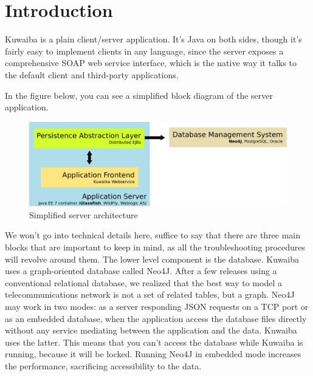 \documentclass[a4paper]{article}
\begin{document}
	\newpage
	\section{Introduction}
		Kuwaiba is a plain client/server application. It's Java on both sides, though it's fairly easy to implement clients in any language, since the server exposes a comprehensive SOAP web service interface, which is the native way it talks to the default client and third-party applications. 
		
		In the figure below, you can see a simplified block diagram of the server application.
		\begin{figure}[h!] %
			\includegraphics[width=\linewidth]{img/block-diagram.png}
			\caption{Simplified server architecture}
		\end{figure}
		
		We won't go into technical details here, suffice to say that there are three main blocks that are important to keep in mind, as all the troubleshooting procedures will revolve around them. The lower level component is the database. Kuwaiba uses a graph-oriented database called Neo4J. After a few releases using a conventional relational database, we realized that the best way to model a telecommunications network is not a set of related tables, but a graph. Neo4J may work in two modes: as a server responding JSON requests on a TCP port or as an embedded database, when the application access the database files directly without any service mediating between the application and the data. Kuwaiba uses the latter. This means that you can't access the database while Kuwaiba is running, because it will be locked. Running Neo4J in embedded mode increases the performance, sacrificing accessibility to the data.\newline
		
\end{document}
